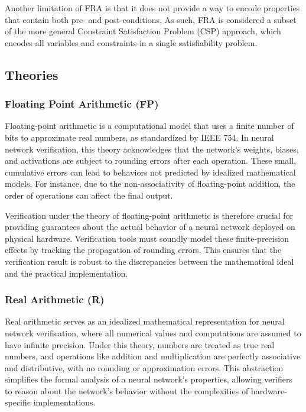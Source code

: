 Another limitation of FRA is that it does not provide a way to encode properties that contain both pre- and post-conditions, As such, 
FRA is considered a subset of the more general Constraint Satisfaction Problem (CSP) approach, which encodes all variables and constraints 
in a single satisfiability problem.

\subsection{Theories}

\subsubsection*{Floating Point Arithmetic (FP)}
Floating-point arithmetic is a computational model that uses a finite number of bits to approximate real numbers, as standardized by IEEE 754. 
In neural network verification, this theory acknowledges that the network's weights, biases, and activations are subject to rounding errors 
after each operation. These small, cumulative errors can lead to behaviors not predicted by idealized mathematical models. For instance, due to 
the non-associativity of floating-point addition, the order of operations can affect the final output.

Verification under the theory of floating-point arithmetic is therefore crucial for providing guarantees about the actual behavior of a neural 
network deployed on physical hardware. Verification tools must soundly model these finite-precision effects by tracking the propagation of rounding errors. 
This ensures that the verification result is robust to the discrepancies between the mathematical ideal and the practical implementation.

\subsubsection*{Real Arithmetic (R)}
Real arithmetic serves as an idealized mathematical representation for neural network verification, where all numerical values and computations are 
assumed to have infinite precision. Under this theory, numbers are treated as true real numbers, and operations like addition and multiplication 
are perfectly associative and distributive, with no rounding or approximation errors. This abstraction simplifies the formal analysis of a neural 
network's properties, allowing verifiers to reason about the network's behavior without the complexities of hardware-specific implementations.

